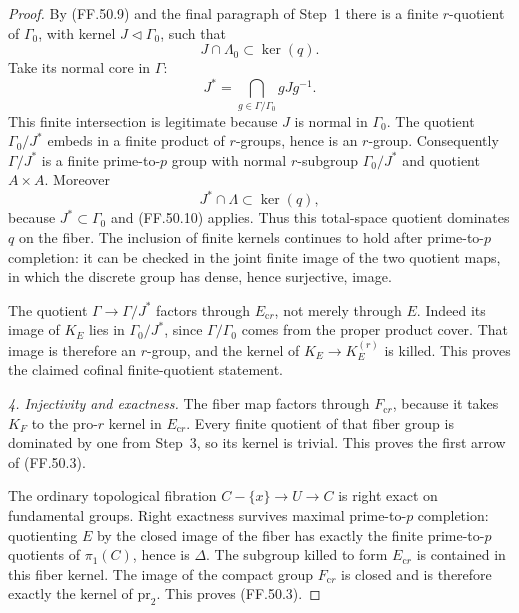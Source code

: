 \begin{proof}
By (FF.50.9) and the final paragraph of Step~1 there is
a finite \(r\)-quotient of \(\Gamma_0\), with kernel
\(J\triangleleft\Gamma_0\), such that
\[
                         J\cap\Lambda_0\subset\ker(q).
                                                        \tag{FF.50.10}
\]
Take its normal core in \(\Gamma\):
\[
                  J^*=\bigcap_{g\in\Gamma/\Gamma_0}gJg^{-1}.
                                                        \tag{FF.50.11}
\]
This finite intersection is legitimate because \(J\) is
normal in \(\Gamma_0\). The quotient
\(\Gamma_0/J^*\) embeds in a finite product of
\(r\)-groups, hence is an \(r\)-group. Consequently
\(\Gamma/J^*\) is a finite prime-to-\(p\) group with
normal \(r\)-subgroup \(\Gamma_0/J^*\) and quotient
\(A\times A\). Moreover
\[
                 J^*\cap\Lambda\subset\ker(q),
                                                        \tag{FF.50.12}
\]
because \(J^*\subset\Gamma_0\) and (FF.50.10) applies.
Thus this total-space quotient dominates \(q\) on the
fiber. The inclusion of finite kernels continues to hold
after prime-to-\(p\) completion: it can be checked in
the joint finite image of the two quotient maps, in which
the discrete group has dense, hence surjective, image.

The quotient \(\Gamma\to\Gamma/J^*\) factors through
\(E_{\mathrm{c}r}\), not merely through \(E\).
Indeed its image of \(K_E\) lies in
\(\Gamma_0/J^*\), since \(\Gamma/\Gamma_0\) comes
from the proper product cover. That image is therefore an
\(r\)-group, and the kernel of \(K_E\to K_E^{(r)}\)
is killed. This proves the claimed cofinal finite-quotient
statement.

\emph{4. Injectivity and exactness.}
The fiber map factors through \(F_{\mathrm{c}r}\),
because it takes \(K_F\) to the pro-\(r\) kernel in
\(E_{\mathrm{c}r}\). Every finite quotient of that fiber
group is dominated by one from Step~3, so its kernel is
trivial. This proves the first arrow of (FF.50.3).

The ordinary topological fibration
\(C-\{x\}\to U\to C\) is right exact on fundamental
groups. Right exactness survives maximal prime-to-\(p\)
completion: quotienting \(E\) by the closed image of
the fiber has exactly the finite prime-to-\(p\) quotients
of \(\pi_1(C)\), hence is \(\Delta\). The subgroup
killed to form \(E_{\mathrm{c}r}\) is contained in
this fiber kernel. The image of the compact group
\(F_{\mathrm{c}r}\) is closed and is therefore exactly
the kernel of \(\mathrm{pr}_2\). This proves (FF.50.3).


\end{proof}
